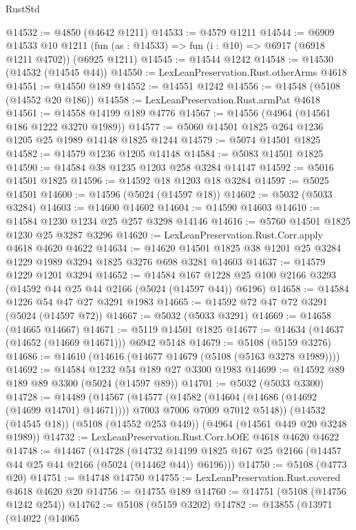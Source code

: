 \begin{lexlean}{RustStd}
\begin{coremodule}
@14532 := @4850 (@4642 @1211)
@14533 := @4579 @1211
@14544 := @6909
    @14533
    @10
    @1211
    (fun (as : @14533) => fun (i : @10) => @6917 (@6918 @1211 @4702))
    (@6925 @1211)
@14545 := @14544 @1242
@14548 := @14530 (@14532 (@14545 @44))
@14550 := LexLeanPreservation.Rust.otherArms @4618
@14551 := @14550 @189
@14552 := @14551 @1242
@14556 := @14548 (@5108 (@14552 @20 @186))
@14558 := LexLeanPreservation.Rust.armPat @4618
@14561 := @14558 @14199 @189 @4776
@14567 := @14556 (@4964 (@14561 @186 @1222 @3270 @1989))
@14577 := @5060 @14501 @1825 @264 @1236 @1205 @25 @1989 @14148 @1825 @1244
@14579 := @5074 @14501 @1825
@14582 := @14579 @1236 @1205 @14148
@14584 := @5083 @14501 @1825
@14590 := @14584 @38 @1235 @1203 @258 @3284 @14147
@14592 := @5016 @14501 @1825
@14596 := @14592 @18 @1203 @18 @3284
@14597 := @5025 @14501
@14600 := @14596 (@5024 (@14597 @18))
@14602 := @5032 (@5033 @3284)
@14603 := @14600 @14602
@14604 := @14590 @14603
@14610 := @14584 @1230 @1234 @25 @257 @3298 @14146
@14616 := @5760 @14501 @1825 @1230 @25 @3287 @3296
@14620 := LexLeanPreservation.Rust.Corr.apply @4618 @4620 @4622
@14634 := @14620 @14501 @1825 @38 @1201 @25 @3284 @1229 @1989 @3294 @1825 @3276 @698 @3281 @14603
@14637 := @14579 @1229 @1201 @3294
@14652 := @14584
    @167
    @1228
    @25
    @100
    @2166
    @3293
    (@14592 @44 @25 @44 @2166 (@5024 (@14597 @44)) @6196)
@14658 := @14584 @1226 @54 @47 @27 @3291 @1983
@14665 := @14592 @72 @47 @72 @3291 (@5024 (@14597 @72))
@14667 := @5032 (@5033 @3291)
@14669 := @14658 (@14665 @14667)
@14671 := @5119 @14501 @1825
@14677 := @14634 (@14637 (@14652 (@14669 @14671))) @6942 @5148
@14679 := @5108 (@5159 @3276)
@14686 := @14610 (@14616 (@14677 @14679 (@5108 (@5163 @3278 @1989))))
@14692 := @14584 @1232 @54 @189 @27 @3300 @1983
@14699 := @14592 @89 @189 @89 @3300 (@5024 (@14597 @89))
@14701 := @5032 (@5033 @3300)
@14728 := @14489
    (@14567
      (@14577
        (@14582 (@14604 (@14686 (@14692 (@14699 @14701) @14671))))
        @7003
        @7006
        @7009
        @7012
        @5148))
    (@14532 (@14545 @18))
    (@5108 (@14552 @253 @449))
    (@4964 (@14561 @449 @20 @3248 @1989))
@14732 := LexLeanPreservation.Rust.Corr.bOfE @4618 @4620 @4622
@14748 := @14467
    (@14728
      (@14732 @14199 @1825 @167 @25 @2166 (@14457 @44 @25 @44 @2166 (@5024 (@14462 @44)) @6196)))
@14750 := @5108 (@4773 @20)
@14751 := @14748 @14750
@14755 := LexLeanPreservation.Rust.covered @4618 @4620 @20
@14756 := @14755 @189
@14760 := @14751 (@5108 (@14756 @1242 @254))
@14762 := @5108 (@5159 @3202)
@14782 := @13855
    (@13971
      (@14022
        (@14065

\end{coremodule}
\end{lexlean}
